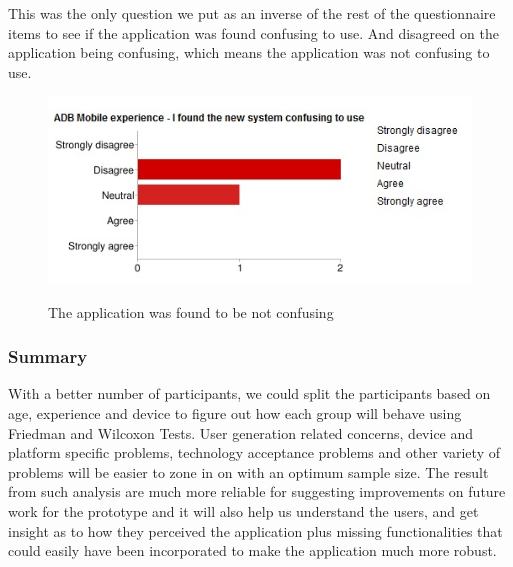 This was the only question we put as an inverse of the rest of the questionnaire items to see if the application was found confusing to use. And disagreed on the application being confusing, which means the application was not confusing to use.

\begin{figure}[htb]
    \centering
    \includegraphics[scale=0.6]{ut_pic/confusing1.jpg}
    \label{fig:App was confusing to use}
    \caption{The application was found to be not confusing}
\end{figure}

\subsubsection{Summary}
With a better number of participants, we could split the participants based on age, experience and device to figure out how each group will behave using Friedman\cite{Friedman} and Wilcoxon\cite{Wilcoxon} Tests. User generation related concerns, device and platform specific problems, technology acceptance problems and other variety of problems will be easier to zone in on with an optimum sample size. The result from such analysis are much more reliable for suggesting improvements on future work for the prototype and it will also help us understand the users, and get insight as to how they perceived the application plus missing functionalities that could easily have been incorporated to make the application much more robust.
\newpage

